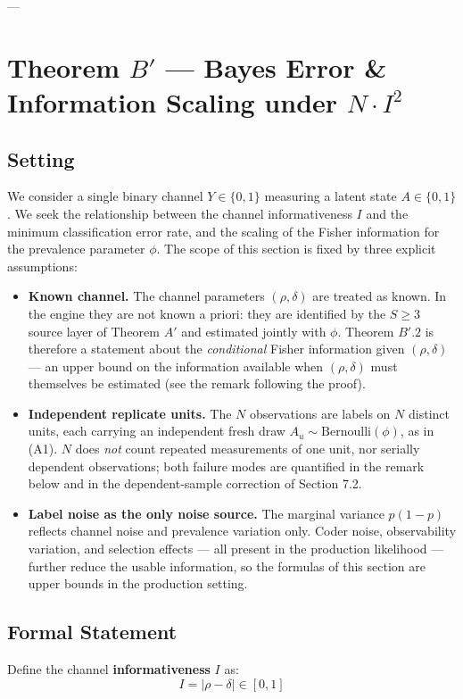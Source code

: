 \documentclass[11pt,a4paper]{article}
\begin{document}
---

\section{Theorem $B'$ --- Bayes Error \& Information Scaling under $N \cdot I^2$}

\subsection{Setting}
We consider a single binary channel $Y \in \{0, 1\}$ measuring a latent state $A \in \{0, 1\}$. We seek the relationship between the channel informativeness $I$ and the minimum classification error rate, and the scaling of the Fisher information for the prevalence parameter $\phi$. The scope of this section is fixed by three explicit assumptions: %
\begin{itemize}
    \item[(B1)] \textbf{Known channel.} The channel parameters $(\rho, \delta)$ are treated as known. In the engine they are not known a priori: they are identified by the $S \ge 3$ source layer of Theorem $A'$ and estimated jointly with $\phi$. Theorem $B'.2$ is therefore a statement about the \emph{conditional} Fisher information given $(\rho, \delta)$ --- an upper bound on the information available when $(\rho, \delta)$ must themselves be estimated (see the remark following the proof). %
    \item[(B2)] \textbf{Independent replicate units.} The $N$ observations are labels on $N$ distinct units, each carrying an independent fresh draw $A_u \sim \mathrm{Bernoulli}(\phi)$, as in (A1). $N$ does \emph{not} count repeated measurements of one unit, nor serially dependent observations; both failure modes are quantified in the remark below and in the dependent-sample correction of Section 7.2. %
    \item[(B3)] \textbf{Label noise as the only noise source.} The marginal variance $p(1-p)$ reflects channel noise and prevalence variation only. Coder noise, observability variation, and selection effects --- all present in the production likelihood --- further reduce the usable information, so the formulas of this section are upper bounds in the production setting. %
\end{itemize}

\subsection{Formal Statement}
Define the channel \textbf{informativeness} $I$ as:
\[
I = |\rho - \delta| \in [0, 1]
\]
\end{document}
